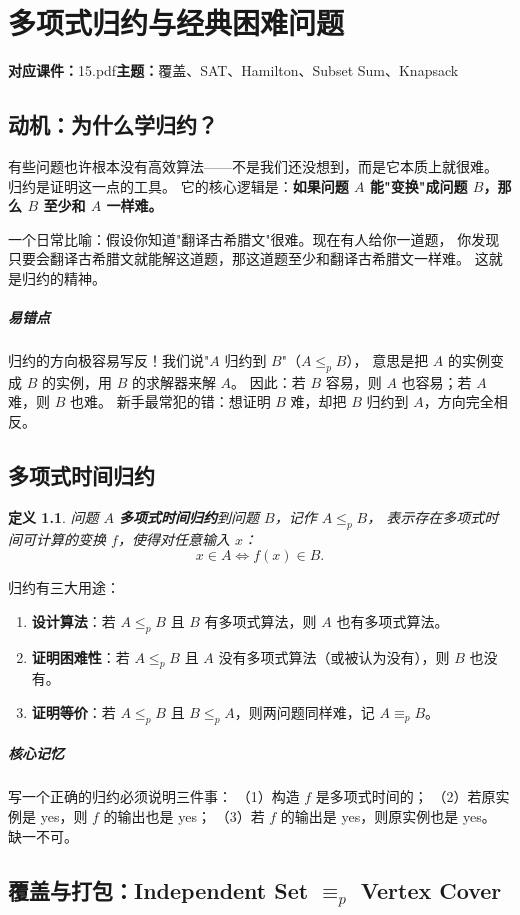 \documentclass[UTF8,openany,12pt]{ctexbook}
\newtheorem{definition}{定义}[chapter]
\theoremstyle{remark}
\newcommand{\lecturewithnumber}[4]{
  \setcounter{chapter}{#1}
  \addtocounter{chapter}{-1}
  \chapter{#3}
  \noindent\textbf{对应课件：}#2\hfill\textbf{主题：}#4
  \vspace{0.6em}
}
\newcommand{\keypoint}[1]{\paragraph{核心记忆}#1}
\newcommand{\pitfall}[1]{\paragraph{易错点}#1}
\begin{document}
\lecturewithnumber{15}{15.pdf}{多项式归约与经典困难问题}{覆盖、SAT、Hamilton、Subset Sum、Knapsack}

\section*{动机：为什么学归约？}

有些问题也许根本没有高效算法——不是我们还没想到，而是它本质上就很难。
归约是证明这一点的工具。
它的核心逻辑是：\textbf{如果问题 $A$ 能"变换"成问题 $B$，那么 $B$ 至少和 $A$ 一样难。}

一个日常比喻：假设你知道"翻译古希腊文"很难。现在有人给你一道题，
你发现只要会翻译古希腊文就能解这道题，那这道题至少和翻译古希腊文一样难。
这就是归约的精神。

\pitfall{归约的方向极容易写反！我们说"$A$ 归约到 $B$"（$A \le_p B$），
意思是把 $A$ 的实例变成 $B$ 的实例，用 $B$ 的求解器来解 $A$。
因此：若 $B$ 容易，则 $A$ 也容易；若 $A$ 难，则 $B$ 也难。
新手最常犯的错：想证明 $B$ 难，却把 $B$ 归约到 $A$，方向完全相反。}

\section{多项式时间归约}

\begin{definition}
问题 $A$ \textbf{多项式时间归约}到问题 $B$，记作 $A \le_p B$，
表示存在多项式时间可计算的变换 $f$，使得对任意输入 $x$：
\[
  x \in A \iff f(x) \in B.
\]
\end{definition}

归约有三大用途：
\begin{enumerate}
  \item \textbf{设计算法}：若 $A \le_p B$ 且 $B$ 有多项式算法，则 $A$ 也有多项式算法。
  \item \textbf{证明困难性}：若 $A \le_p B$ 且 $A$ 没有多项式算法（或被认为没有），则 $B$ 也没有。
  \item \textbf{证明等价}：若 $A \le_p B$ 且 $B \le_p A$，则两问题同样难，记 $A \equiv_p B$。
\end{enumerate}

\keypoint{
  写一个正确的归约必须说明三件事：
  （1）构造 $f$ 是多项式时间的；
  （2）若原实例是 yes，则 $f$ 的输出也是 yes；
  （3）若 $f$ 的输出是 yes，则原实例也是 yes。
  缺一不可。
}

\section[覆盖与打包：Independent Set 等价于 Vertex Cover]{覆盖与打包：Independent Set $\equiv_p$ Vertex Cover}
\end{document}
